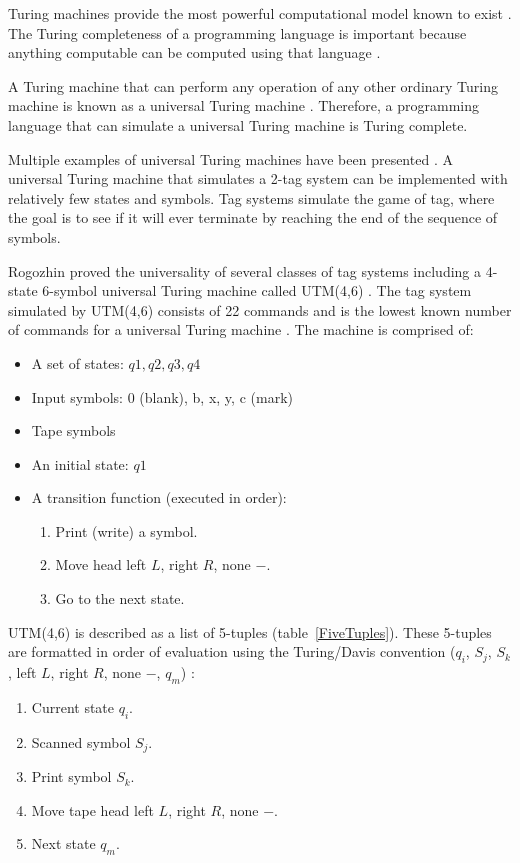 \label{appendix:TEBNFTuringCompletenessProof}

Turing machines provide the most powerful computational model known to exist \cite{kepser_01}.  The Turing completeness of a programming language is important because anything computable can be computed using that language \cite{kepser_01}.

\indent
A Turing machine that can perform any operation of any other ordinary Turing machine is known as a universal Turing machine \cite{moore_01}.  Therefore, a programming language that can simulate a universal Turing machine is Turing complete.

Multiple examples of universal Turing machines have been presented \cite{rogozhin_01,shannon_01,neary_01}.  A universal Turing machine that simulates a 2-tag system can be implemented with relatively few states and symbols.  Tag systems simulate the game of tag, where the goal is to see if it will ever terminate by reaching the end of the sequence of symbols.

\indent
Rogozhin proved the universality of several classes of tag systems including a 4-state 6-symbol universal Turing machine called UTM(4,6) \cite{rogozhin_01}.  The tag system simulated by UTM(4,6) consists of 22 commands and is the lowest known number of commands for a universal Turing machine \cite{rogozhin_01}.  The machine is comprised of:
\begin{itemize}
  \item A set of states: $q1, q2, q3, q4$
  \item Input symbols: 0 (blank), b, x, y, c (mark)
  \item Tape symbols
  \item An initial state: $q1$
  \item A transition function (executed in order):
  \begin{enumerate}
    \item Print (write) a symbol.
    \item Move head left $L$, right $R$, none $-$.
    \item Go to the next state. 
  \end{enumerate}
\end{itemize}

\indent
UTM(4,6) \cite{rogozhin_01} is described as a list of 5-tuples (table~\ref{FiveTuples}).  These 5-tuples are formatted in order of evaluation using the Turing/Davis convention ($q_i$, $S_j$, $S_k$, left $L$, right $R$, none $-$, $q_m$) \cite{kumar_01}:
\begin{enumerate}
  \item Current state $q_i$.
  \item Scanned symbol $S_j$.
  \item Print symbol $S_k$.
  \item Move tape head left $L$, right $R$, none $-$.
  \item Next state $q_m$.
\end{enumerate}

